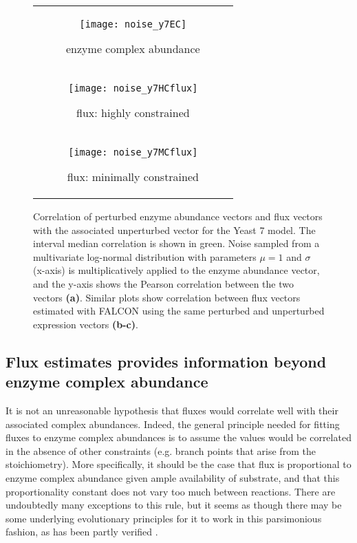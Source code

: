 \begin{figure}
\centering
\begin{tabular}{c}
  \begin{subfigure}[b]{0.5\textwidth}
  \texttt{[image: noise\_y7EC]}
  \caption{enzyme complex abundance} \label{fig:ExpSens:A}
  \end{subfigure}
\\
  \begin{subfigure}[b]{0.5\textwidth}
  \texttt{[image: noise\_y7HCflux]}
  \caption{flux: highly constrained} \label{fig:ExpSens:B}
  \end{subfigure} 
\\
  \begin{subfigure}[b]{0.5\textwidth}
  \texttt{[image: noise\_y7MCflux]}
  \caption{flux: minimally constrained} \label{fig:ExpSens:C}
  \end{subfigure} 
\\
\end{tabular}
\vspace{-4mm} 
\caption{
Correlation of perturbed enzyme abundance vectors and flux
vectors with the associated unperturbed vector for the 
Yeast 7 model. The interval median
correlation is shown in green. Noise sampled from a multivariate
log-normal distribution with parameters $\mu=1$ and $\sigma$ (x-axis) is
multiplicatively applied to the enzyme abundance vector, and the
y-axis shows the Pearson correlation between the two vectors
\textbf{(a)}. Similar plots show correlation between flux vectors estimated
with FALCON using the same perturbed and unperturbed expression
vectors \textbf{(b-c)}.}
\label{fig:ExpSens}
\end{figure}


\subsection{Flux estimates provides information beyond enzyme complex abundance}
It is not an unreasonable hypothesis that fluxes would correlate well
with their associated complex abundances. Indeed, the general
principle needed for fitting fluxes to enzyme complex abundances is to
assume the values would be correlated in the absence of other
constraints (e.g. branch points that arise from the
stoichiometry). More specifically, it should be the case that flux is
proportional to enzyme complex abundance given ample availability of
substrate, and that this proportionality constant does not vary too
much between reactions.  There are undoubtedly many exceptions to this
rule, but it seems as though there may be some underlying evolutionary
principles for it to work in this parsimonious fashion, as has been
partly verified \citep{Bennett2009}.

